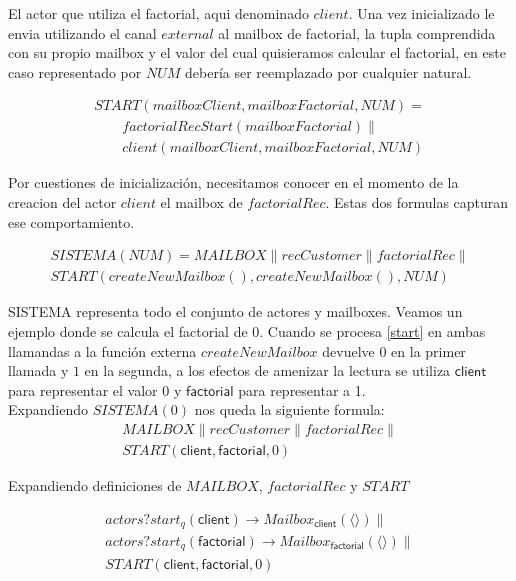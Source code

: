 \documentclass[fleqn]{article}
\newcommand{\myList}[1]{\langle #1 \rangle}
\begin{document}
El actor que utiliza el factorial, aqui denominado $client$. Una vez inicializado le envia utilizando el canal $external$ al mailbox de factorial, la tupla comprendida con su propio mailbox y el valor del cual quisieramos calcular el factorial, en este caso representado por $NUM$ debería ser reemplazado por cualquier natural. 

\begin{gather*}
  START(mailboxClient, mailboxFactorial, NUM) = \\
  \qquad factorialRecStart(mailboxFactorial) \parallel \\
  \qquad client(mailboxClient, mailboxFactorial, NUM) 
\end{gather*}

Por cuestiones de inicialización, necesitamos conocer en el momento de la creacion del actor $client$ el mailbox de $factorialRec$. Estas dos formulas capturan ese comportamiento.

\begin{gather*}
  SISTEMA(NUM) = MAILBOX \parallel
  recCustomer \parallel
  factorialRec \parallel \\
  START(createNewMailbox(), createNewMailbox(), NUM) \label{start}
\end{gather*}

\newcommand{\mbc}[0]{\mathsf{client}}
\newcommand{\mbf}[0]{\mathsf{factorial}}

SISTEMA representa todo el conjunto de actores y mailboxes. Veamos un ejemplo
donde se calcula el factorial de 0. Cuando se procesa \ref{start} en ambas llamandas a la función
externa $createNewMailbox$ devuelve $0$ en la primer
llamada y $1$ en la segunda, a los efectos de amenizar la lectura se utiliza
$\mbc$ para representar el valor 0 y $\mbf$ para representar a 1.\\

Expandiendo $SISTEMA(0)$ nos queda la siguiente formula:
\begin{gather*}
MAILBOX \parallel
  recCustomer \parallel
  factorialRec \parallel \\
  START(\mbc, \mbf, 0)
\end{gather*}

Expandiendo definiciones de $MAILBOX$, $factorialRec$ y $START$

\begin{gather*}
actors?start_q(\mbc) \rightarrow Mailbox_\mbc(\myList{}) \parallel \\
actors?start_q(\mbf) \rightarrow Mailbox_\mbf(\myList{}) \parallel \\
START(\mbc, \mbf, 0) 
\end{gather*}
\end{document}
